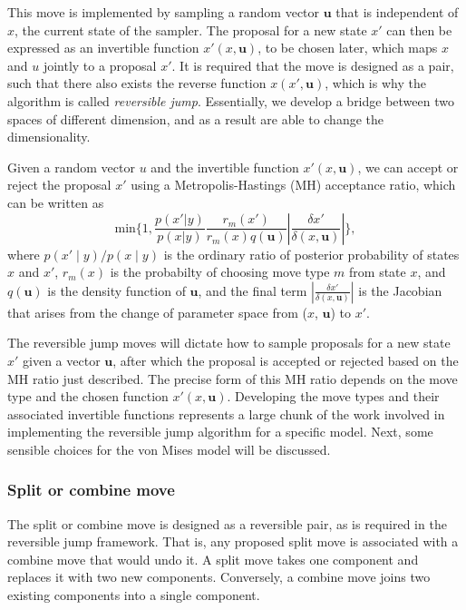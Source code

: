 This move is implemented by sampling a random vector $\bm u$ that is independent of $x$, the current state of the sampler. The proposal for a new state $x'$ can then be expressed as an invertible function $x'(x, \bm u)$, to be chosen later, which maps $x$ and $u$ jointly to a proposal $x'$. It is required that the move is designed as a pair, such that there also exists the reverse function $x(x', \bm u)$, which is why the algorithm is called \textit{reversible jump}. Essentially, we develop a bridge between two spaces of different dimension, and as a result are able to change the dimensionality.

Given a random vector $u$ and the invertible function $x'(x, \bm u)$, we can accept or reject the proposal $x'$ using a Metropolis-Hastings (MH) acceptance ratio, which can be written as
\begin{equation}
\label{eq:acceptance-prob}
\text{min} \bigg \{ 1, \frac{p(x' | y)}{p(x | y)} \frac{r_m(x')}{r_m(x)q(\bm u)} \left| \frac{\delta x'}{\delta (x, \bm u)} \right| \bigg \},
\end{equation}
where $p(x' \mid y)/p(x \mid y)$ is the ordinary ratio of posterior probability of states $x$ and $x'$, $r_m(x)$ is the probabilty of choosing move type $m$ from state $x$, and $q(\bm u)$ is the density function of $\bm u$, and the final term $ \left| \frac{\delta x'}{\delta (x, \bm u)} \right|$ is the Jacobian that arises from the change of parameter space from ($x$, $\bm u$) to $x'$. 

The reversible jump moves will dictate how to sample proposals for a new state $x'$ given a vector $\bm u$, after which the proposal is accepted or rejected based on the MH ratio just described. The precise form of this MH ratio depends on the move type and the chosen function $x'(x, \bm u)$.  Developing the move types and their associated invertible functions represents a large chunk of the work involved in implementing the reversible jump algorithm for a specific model.   Next, some sensible choices for the von Mises model will be discussed. 

\subsubsection{Split or combine move}
The split or combine move is designed as a reversible pair, as is required in the reversible jump framework. That is, any proposed split move is associated with a combine move that would undo it. A split move takes one component and replaces it with two new components. Conversely, a combine move joins two existing components into a single component.

